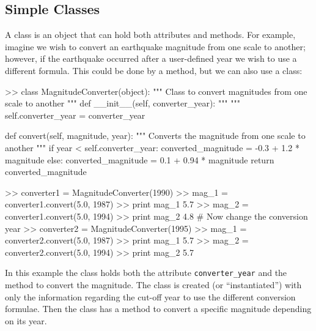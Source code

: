 \subsection{Simple Classes}

A class is an object that can hold both attributes and methods. For example, imagine we wish to convert an earthquake magnitude from one scale to another; however, if the earthquake occurred after a user-defined year we wish to use a different formula. This could be done by a method, but we can also use a class:

\begin{python}[frame=single]
>> class MagnitudeConverter(object):
       """
       Class to convert magnitudes from one scale to another
       """
       def __init__(self, converter_year):
           """
           """
           self.converter_year = converter_year

       def convert(self, magnitude, year):
           """
           Converts the magnitude from one scale to another
           """
           if year < self.converter_year:
               converted_magnitude = -0.3 + 1.2 * magnitude
           else:
               converted_magnitude = 0.1 + 0.94 * magnitude
           return converted_magnitude

>> converter1 = MagnitudeConverter(1990)
>> mag_1 = converter1.convert(5.0, 1987)
>> print mag_1
5.7
>> mag_2 = converter1.convert(5.0, 1994)
>> print mag_2
4.8
# Now change the conversion year
>> converter2 = MagnitudeConverter(1995)
>> mag_1 = converter2.convert(5.0, 1987)
>> print mag_1
5.7
>> mag_2 = converter2.convert(5.0, 1994)
>> print mag_2
5.7
\end{python}

In this example the class holds both the attribute \verb=converter_year= and the method to convert the magnitude. The class is created (or ``instantiated'') with only the information regarding the cut-off year to use the different conversion formulae. Then the class has a method to convert a specific magnitude depending on its year.



